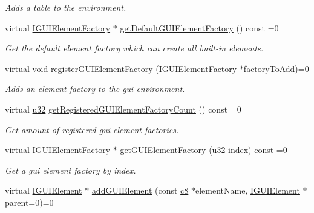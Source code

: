 \begin{DoxyCompactItemize}
\begin{DoxyCompactList}\small\item\em Adds a table to the environment. \end{DoxyCompactList}\item 
virtual \hyperlink{classirr_1_1gui_1_1IGUIElementFactory}{I\+G\+U\+I\+Element\+Factory} $\ast$ \hyperlink{classirr_1_1gui_1_1IGUIEnvironment_a13ec41a31e1b9cdc317c0c6092c2b820}{get\+Default\+G\+U\+I\+Element\+Factory} () const =0
\begin{DoxyCompactList}\small\item\em Get the default element factory which can create all built-\/in elements. \end{DoxyCompactList}\item 
virtual void \hyperlink{classirr_1_1gui_1_1IGUIEnvironment_a653ac2cc8640899c23f4d55d9a5f0fdd}{register\+G\+U\+I\+Element\+Factory} (\hyperlink{classirr_1_1gui_1_1IGUIElementFactory}{I\+G\+U\+I\+Element\+Factory} $\ast$factory\+To\+Add)=0
\begin{DoxyCompactList}\small\item\em Adds an element factory to the gui environment. \end{DoxyCompactList}\item 
virtual \hyperlink{namespaceirr_a0416a53257075833e7002efd0a18e804}{u32} \hyperlink{classirr_1_1gui_1_1IGUIEnvironment_a022dcd144b1f955180569ef2ee844561}{get\+Registered\+G\+U\+I\+Element\+Factory\+Count} () const =0
\begin{DoxyCompactList}\small\item\em Get amount of registered gui element factories. \end{DoxyCompactList}\item 
virtual \hyperlink{classirr_1_1gui_1_1IGUIElementFactory}{I\+G\+U\+I\+Element\+Factory} $\ast$ \hyperlink{classirr_1_1gui_1_1IGUIEnvironment_a3c1ec1c13e7339e2e8abb34276d6288f}{get\+G\+U\+I\+Element\+Factory} (\hyperlink{namespaceirr_a0416a53257075833e7002efd0a18e804}{u32} index) const =0
\begin{DoxyCompactList}\small\item\em Get a gui element factory by index. \end{DoxyCompactList}\item 
virtual \hyperlink{classirr_1_1gui_1_1IGUIElement}{I\+G\+U\+I\+Element} $\ast$ \hyperlink{classirr_1_1gui_1_1IGUIEnvironment_a17114e35fc67f6d54df1baebb806f3b7}{add\+G\+U\+I\+Element} (const \hyperlink{namespaceirr_a9395eaea339bcb546b319e9c96bf7410}{c8} $\ast$element\+Name, \hyperlink{classirr_1_1gui_1_1IGUIElement}{I\+G\+U\+I\+Element} $\ast$parent=0)=0

\end{DoxyCompactItemize}
